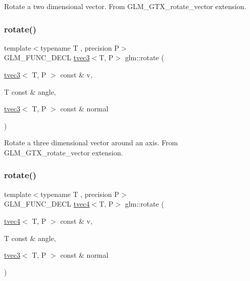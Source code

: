 Rotate a two dimensional vector. From G\+L\+M\+\_\+\+G\+T\+X\+\_\+rotate\+\_\+vector extension. \mbox{\label{group__gtx__rotate__vector_ga526b6f8995bc0946aa1a04e9297de7c6}} 
\subsubsection{\texorpdfstring{rotate()}{rotate()}\hspace{0.1cm}{\footnotesize\ttfamily [2/3]}}
{\footnotesize\ttfamily template$<$typename T , precision P$>$ \\
G\+L\+M\+\_\+\+F\+U\+N\+C\+\_\+\+D\+E\+CL \hyperlink{structglm_1_1tvec3}{tvec3}$<$T, P$>$ glm\+::rotate (\begin{DoxyParamCaption}\item[{\hyperlink{structglm_1_1tvec3}{tvec3}$<$ T, P $>$ const \&}]{v,  }\item[{T const \&}]{angle,  }\item[{\hyperlink{structglm_1_1tvec3}{tvec3}$<$ T, P $>$ const \&}]{normal }\end{DoxyParamCaption})}

Rotate a three dimensional vector around an axis. From G\+L\+M\+\_\+\+G\+T\+X\+\_\+rotate\+\_\+vector extension. \mbox{\label{group__gtx__rotate__vector_gaf4d59dd2f668f9ffb38048055d1316bd}} 
\subsubsection{\texorpdfstring{rotate()}{rotate()}\hspace{0.1cm}{\footnotesize\ttfamily [3/3]}}
{\footnotesize\ttfamily template$<$typename T , precision P$>$ \\
G\+L\+M\+\_\+\+F\+U\+N\+C\+\_\+\+D\+E\+CL \hyperlink{structglm_1_1tvec4}{tvec4}$<$T, P$>$ glm\+::rotate (\begin{DoxyParamCaption}\item[{\hyperlink{structglm_1_1tvec4}{tvec4}$<$ T, P $>$ const \&}]{v,  }\item[{T const \&}]{angle,  }\item[{\hyperlink{structglm_1_1tvec3}{tvec3}$<$ T, P $>$ const \&}]{normal }\end{DoxyParamCaption})}

